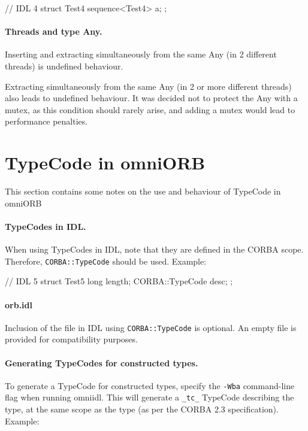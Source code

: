 \documentclass[11pt,twoside,a4paper]{book}
\newcommand{\type}[1]{\texttt{#1}}
\newcommand{\code}[1]{\texttt{#1}}
\newcommand{\file}{\begingroup \urlstyle{tt}\Url}
\begin{document}
\begin{idllisting}
// IDL 4
struct Test4 {
  sequence<Test4> a;
};
\end{idllisting}


\paragraph*{Threads and type Any.}
Inserting and extracting simultaneously from the same Any (in 2
different threads) is undefined behaviour.

Extracting simultaneously from the same Any (in 2 or more different
threads) also leads to undefined behaviour.  It was decided not to
protect the Any with a mutex, as this condition should rarely arise,
and adding a mutex would lead to performance penalties.


\section{TypeCode in omniORB}

This section contains some notes on the use and behaviour of TypeCode
in omniORB

\paragraph*{TypeCodes in IDL.}

When using TypeCodes in IDL, note that they are defined in the CORBA
scope.  Therefore, \type{CORBA::TypeCode} should be used. Example:

\begin{idllisting}
// IDL 5
struct Test5 {
  long length;
  CORBA::TypeCode desc;
};
\end{idllisting}

\paragraph*{orb.idl}

Inclusion of the file \file{orb.idl} in IDL using
\type{CORBA::TypeCode} is optional.  An empty \file{orb.idl} file is
provided for compatibility purposes.

\paragraph*{Generating TypeCodes for constructed types.}

To generate a TypeCode for constructed types, specify the
\texttt{-Wba} command-line flag when running omniidl. This will
generate a \code{\_tc\_} TypeCode describing the type, at the same
scope as the type (as per the CORBA 2.3 specification). Example:
\end{document}
